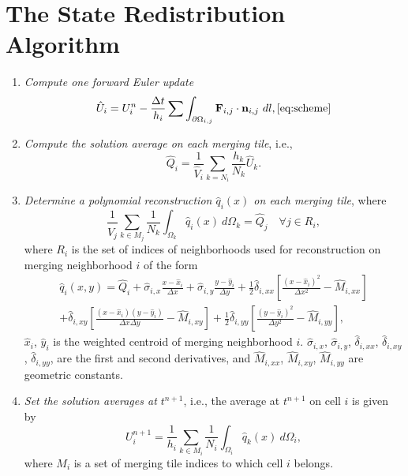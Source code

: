 \section{The State Redistribution Algorithm}\label{srdAlg}
\begin{enumerate}[label=Step \arabic*:]
    \item \textit{Compute one forward Euler update}
    \begin{equation} 
    \hat{U}_i = U^n_i - \frac{\Delta t}{h_i}\sum \int_{\partial \Omega_{i,j}} \mathbf{F}_{i,j} \cdot \mathbf{n}_{i,j}~dl,\ref{eq:scheme}
    \end{equation}
	\item \textit{Compute the solution average on each merging tile}, i.e.,
	\begin{equation}\label{eq:q_avg1}
	    \hat Q_i =  \frac{1}{\hat V_i}\sum_{k = N_i}\frac{h_k}{N_k} \hat U_k.
	\end{equation}
\item \textit{Determine a polynomial reconstruction $\hat q_i(x)$ on each merging tile}, where
\begin{equation}\label{eq:qi}
\frac{1}{\hat V_j}\sum_{k \in M_j}\frac{1}{N_k}\int_{\Omega_k} \hat q_i(x)~d\Omega_k = \hat Q_j \quad \forall j \in R_i,
\end{equation}
where $R_i$ is the set of indices of neighborhoods used for reconstruction on merging neighborhood $i$ of the form
\begin{equation}\label{eq:q}
\begin{aligned}
	    \hat q_i(x,y) = \hat Q_{i} + \hat \sigma_{i,x}\frac{x-\hat x_i}{\Delta x} +  \hat \sigma_{i,y}\frac{y-\hat y_i}{\Delta y} + \frac{1}{2}\hat \delta_{i, xx}\left[ \frac{(x - \hat x_i)^2 }{\Delta x^2} - \hat M_{i,xx}\right]\\
	    +\hat \delta_{i, xy}\left[ \frac{(x - \hat x_i) (y - \hat y_i) }{\Delta x \Delta y} - \hat M_{i,xy}\right] + \frac{1}{2}\hat \delta_{i, yy}\left[ \frac{(y - \hat y_i)^2 }{\Delta y^2} -  \hat M_{i,yy}\right],
\end{aligned}
\end{equation}
$\hat x_i$, $\hat y_i$ is the weighted centroid of merging neighborhood $i$. $\hat \sigma_{i,x}$, $\hat \sigma_{i,y}$, $\hat \delta_{i,xx}$, $\hat \delta_{i,xy}$, $\hat \delta_{i,yy}$, are the first and second derivatives, and $ \hat M_{i,xx}$, $\hat M_{i,xy}$,  $\hat M_{i,yy}$ are geometric constants. 

\item \textit{Set the solution averages at $t^{n+1}$}, i.e., the average at $t^{n+1}$ on cell $i$ is given by
	\begin{equation}\label{eq:final_update}
	U^{n+1}_i =  \frac{1}{h_i}\sum_{k \in M_{i}}\frac{1}{N_i}\int_{\Omega_i} \hat q_k(x)~d\Omega_i,
	\end{equation}
	where $M_i$ is a set of merging tile indices to which cell $i$ belongs.
\end{enumerate}

	